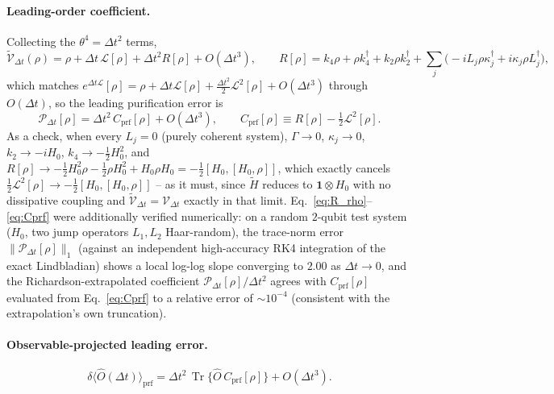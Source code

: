 \documentclass[11pt]{article}
\newcommand{\calV}{\mathcal{V}}
\newcommand{\Dt}{\Delta t}
\newcommand{\calL}{\mathcal{L}}
\newcommand{\calP}{\mathcal{P}}
\DeclareMathOperator{\Tr}{Tr}
\begin{document}
\paragraph{Leading-order coefficient.} Collecting the $\theta^4=\Dt^2$ terms,
\begin{equation}\label{eq:R_rho}
    \tilde{\calV}_{\Dt}(\rho) = \rho+\Dt\,\calL[\rho]+\Dt^2R[\rho]+O(\Dt^3),\qquad R[\rho] = k_4\rho+\rho k_4^\dagger+k_2\rho k_2^\dagger+\sum_j\Big(-iL_j\rho\kappa_j^\dagger+i\kappa_j\rho L_j^\dagger\Big),
\end{equation}
which matches $e^{\Dt\calL}[\rho]=\rho+\Dt\calL[\rho]+\frac{\Dt^2}{2}\calL^2[\rho]+O(\Dt^3)$ through $O(\Dt)$, so the leading purification error is
\begin{equation}\label{eq:Cprf}
    \calP_{\Dt}[\rho] = \Dt^2\,C_{\text{prf}}[\rho]+O(\Dt^3),\qquad C_{\text{prf}}[\rho]\equiv R[\rho]-\tfrac12\calL^2[\rho].
\end{equation}
As a check, when every $L_j=0$ (purely coherent system), $\Gamma\to0$, $\kappa_j\to0$, $k_2\to-iH_0$, $k_4\to-\tfrac12H_0^2$, and $R[\rho]\to-\tfrac12H_0^2\rho-\tfrac12\rho H_0^2+H_0\rho H_0=-\tfrac12[H_0,[H_0,\rho]]$, which exactly cancels $\tfrac12\calL^2[\rho]\to-\tfrac12[H_0,[H_0,\rho]]$ -- as it must, since $\tilde{H}$ reduces to $\mathbf{1}\otimes H_0$ with no dissipative coupling and $\tilde{\calV}_{\Dt}=\calV_{\Dt}$ exactly in that limit. Eq.~\eqref{eq:R_rho}--\eqref{eq:Cprf} were additionally verified numerically: on a random $2$-qubit test system ($H_0$, two jump operators $L_1,L_2$ Haar-random), the trace-norm error $\|\calP_{\Dt}[\rho]\|_1$ (against an independent high-accuracy RK4 integration of the exact Lindbladian) shows a local log-log slope converging to $2.00$ as $\Dt\to0$, and the Richardson-extrapolated coefficient $\calP_{\Dt}[\rho]/\Dt^2$ agrees with $C_{\text{prf}}[\rho]$ evaluated from Eq.~\eqref{eq:Cprf} to a relative error of $\sim10^{-4}$ (consistent with the extrapolation's own truncation).

\paragraph{Observable-projected leading error.}
\begin{equation}\label{eq:prf_leading_obs}
    \delta\langle\hat{O}(\Dt)\rangle_{\text{prf}} = \Dt^2\,\Tr\{\hat{O}\,C_{\text{prf}}[\rho]\}+O(\Dt^3).
\end{equation}
\end{document}
